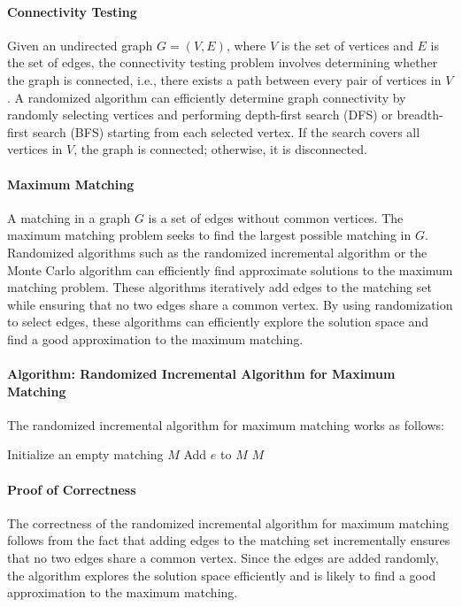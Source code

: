 \documentclass[12pt]{book} %
\begin{document}
\paragraph{Connectivity Testing}
Given an undirected graph \(G = (V, E)\), where \(V\) is the set of vertices and \(E\) is the set of edges, the connectivity testing problem involves determining whether the graph is connected, i.e., there exists a path between every pair of vertices in \(V\). A randomized algorithm can efficiently determine graph connectivity by randomly selecting vertices and performing depth-first search (DFS) or breadth-first search (BFS) starting from each selected vertex. If the search covers all vertices in \(V\), the graph is connected; otherwise, it is disconnected.

\paragraph{Maximum Matching}
A matching in a graph \(G\) is a set of edges without common vertices. The maximum matching problem seeks to find the largest possible matching in \(G\). Randomized algorithms such as the randomized incremental algorithm or the Monte Carlo algorithm can efficiently find approximate solutions to the maximum matching problem. These algorithms iteratively add edges to the matching set while ensuring that no two edges share a common vertex. By using randomization to select edges, these algorithms can efficiently explore the solution space and find a good approximation to the maximum matching.

\paragraph{Algorithm: Randomized Incremental Algorithm for Maximum Matching}
The randomized incremental algorithm for maximum matching works as follows:
\FloatBarrier
\begin{algorithm}[H]
\caption{Randomized Incremental Algorithm for Maximum Matching}
\begin{algorithmic}[1]
    \State Initialize an empty matching \(M\)
            \State Add \(e\) to \(M\)
        \EndIf
    \EndFor
    \State \Return \(M\)
\EndProcedure
\end{algorithmic}
\end{algorithm}
\FloatBarrier
\paragraph{Proof of Correctness}
The correctness of the randomized incremental algorithm for maximum matching follows from the fact that adding edges to the matching set incrementally ensures that no two edges share a common vertex. Since the edges are added randomly, the algorithm explores the solution space efficiently and is likely to find a good approximation to the maximum matching.
\end{document}
